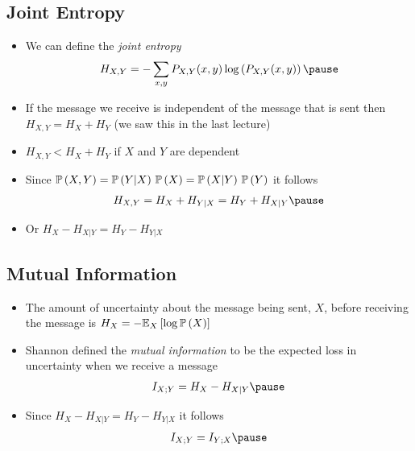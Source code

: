 \begin{slide}
\section[-1]{Joint Entropy}

\begin{PauseHighLight}
  \begin{itemize}
  \item We can define the \emph{joint entropy}
    \begin{align*}
      H_{X,Y} = - \sum_{x,y} P_{X,Y}(x,y) \logg{P_{X,Y}(x,y)}\pause
    \end{align*}
  \item If the message we receive is independent of the message that
    is sent then $H_{X,Y} = H_X + H_Y$ (we saw this in the last
    lecture)\pause
  \item $H_{X,Y} < H_X + H_Y$ if $X$ and $Y$ are dependent\pause
  \item Since $\Prob{X,Y} = \Prob{Y|X}\,\Prob{X} =
    \Prob{X|Y}\,\Prob{Y}$ it follows
    \begin{align*}
      H_{X,Y} = H_{X} + H_{Y|X} = H_{Y} + H_{X|Y}\pause
    \end{align*}
  \item Or $H_{X} - H_{X|Y} = H_{Y} - H_{Y|X}$\pause
  \end{itemize}
\end{PauseHighLight}

\end{slide}



\begin{slide}
\section{Mutual Information}

\begin{PauseHighLight}
  \begin{itemize}
  \item The amount of uncertainty about the message being sent, $X$,
    before receiving the message is
    $H_X=-\av[X]{\log{\Prob{X}}}$\pause
  \item Shannon defined the \textit{mutual information} to be the expected loss
    in uncertainty when we receive a message
    \begin{align*}
      I_{X;Y} = H_X - H_{X|Y}\pause
    \end{align*}
  \item Since $H_{X} - H_{X|Y} = H_{Y} - H_{Y|X}$ it follows
    \begin{align*}
      I_{X; Y} = I_{Y; X}\pause
    \end{align*}
  \end{itemize}
\end{PauseHighLight}
\end{slide}


